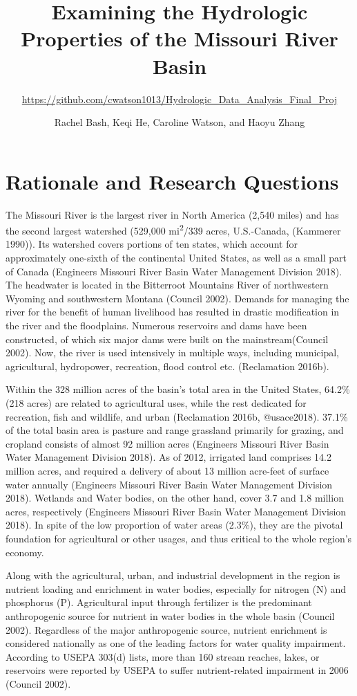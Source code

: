 \documentclass[12pt,]{article}
\title{Examining the Hydrologic Properties of the Missouri River Basin}
\subtitle{\url{https://github.com/cwatson1013/Hydrologic_Data_Analysis_Final_Proj}}
\author{Rachel Bash, Keqi He, Caroline Watson, and Haoyu Zhang}
\date{}
\begin{document}
\maketitle

\newpage

\hypertarget{rationale-and-research-questions}{%
\section{Rationale and Research
Questions}\label{rationale-and-research-questions}}

The Missouri River is the largest river in North America (2,540 miles)
and has the second largest watershed (529,000 mi\textsuperscript{2}/339
acres, U.S.-Canada, (Kammerer 1990)). Its watershed covers portions of
ten states, which account for approximately one-sixth of the continental
United States, as well as a small part of Canada (Engineers Missouri
River Basin Water Management Division 2018). The headwater is located in
the Bitterroot Mountains River of northwestern Wyoming and southwestern
Montana (Council 2002). Demands for managing the river for the benefit
of human livelihood has resulted in drastic modification in the river
and the floodplains. Numerous reservoirs and dams have been constructed,
of which six major dams were built on the mainstream(Council 2002). Now,
the river is used intensively in multiple ways, including municipal,
agricultural, hydropower, recreation, flood control etc. (Reclamation
2016b).

Within the 328 million acres of the basin's total area in the United
States, 64.2\% (218 acres) are related to agricultural uses, while the
rest dedicated for recreation, fish and wildlife, and urban (Reclamation
2016b, @usace2018). 37.1\% of the total basin area is pasture and range
grassland primarily for grazing, and cropland consists of almost 92
million acres (Engineers Missouri River Basin Water Management Division
2018). As of 2012, irrigated land comprises 14.2 million acres, and
required a delivery of about 13 million acre-feet of surface water
annually (Engineers Missouri River Basin Water Management Division
2018). Wetlands and Water bodies, on the other hand, cover 3.7 and 1.8
million acres, respectively (Engineers Missouri River Basin Water
Management Division 2018). In spite of the low proportion of water areas
(2.3\%), they are the pivotal foundation for agricultural or other
usages, and thus critical to the whole region's economy.

Along with the agricultural, urban, and industrial development in the
region is nutrient loading and enrichment in water bodies, especially
for nitrogen (N) and phosphorus (P). Agricultural input through
fertilizer is the predominant anthropogenic source for nutrient in water
bodies in the whole basin (Council 2002). Regardless of the major
anthropogenic source, nutrient enrichment is considered nationally as
one of the leading factors for water quality impairment. According to
USEPA 303(d) lists, more than 160 stream reaches, lakes, or reservoirs
were reported by USEPA to suffer nutrient-related impairment in 2006
(Council 2002).
\end{document}

